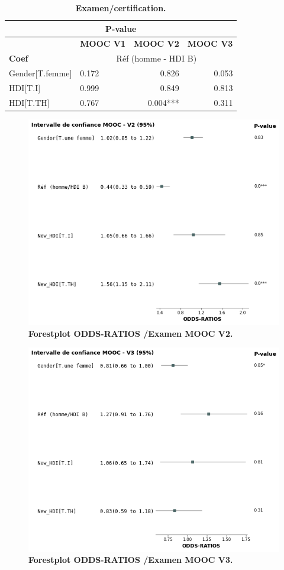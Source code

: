 \documentclass[12pt, a4paper, titlepage, table]{article}
\begin{document}
\begin{table}[H]
	\centering
	\fontsize{12}{20}\selectfont
	\begin{tabular}{|l|l|r|r|}
		\hline
		\multicolumn{4}{|c|}{\textbf{P-value}}\\
		\hline
		\multicolumn{1}{|c|}{\textbf{}}&
		\multicolumn{1}{c|}{\textbf{MOOC V1}}&
		\multicolumn{1}{c|}{\textbf{MOOC V2}}&
		\multicolumn{1}{c|}{\textbf{MOOC V3}}\\
		\hline
		\textbf{Coef}&
		\multicolumn{3}{c|}{Réf (homme - HDI B)}\\
		\hline
		Gender[T.femme]&	0.172&	0.826&	0.053\\
		HDI[T.I]&		0.999&	0.849&	0.813\\
		HDI[T.TH]&		0.767&	0.004***&	0.311\\
		\hline
	\end{tabular}
	\caption{\textbf{Examen/certification.}}
\end{table}

\begin{figure}[H]
	\centering
	\includegraphics[width=1\textwidth]{../../graph/forestplot_v2.png}
	\caption{\textbf{Forestplot ODDS-RATIOS /Examen MOOC V2.}}
\end{figure}

\begin{figure}[H]
	\centering
	\includegraphics[width=1\textwidth]{../../graph/forestplot_v3.png}
	\caption{\textbf{Forestplot ODDS-RATIOS /Examen MOOC V3.}}
\end{figure}
\end{document}
